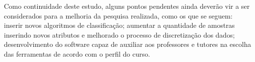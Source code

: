 \documentclass[12pt]{article}
\begin{document}
Como continuidade deste estudo, alguns pontos pendentes ainda deverão vir a ser considerados para a melhoria da pesquisa realizada, como os que se seguem: inserir novos algoritmos de classificação; aumentar a quantidade de amostras inserindo novos atributos e melhorado o processo de discretização dos dados; desenvolvimento do software capaz de auxiliar aos professores e tutores na escolha das ferramentas de acordo com o perfil do curso. 




\end{document}
